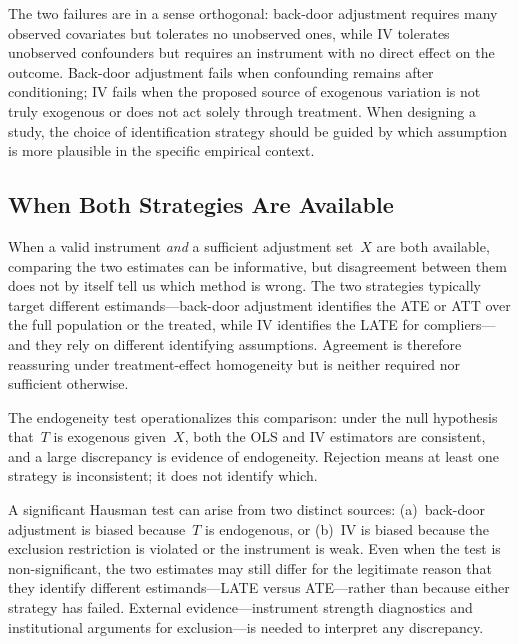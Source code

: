 \documentclass[master.tex]{subfiles}
\begin{document}
\medskip\noindent The two failures are in a sense orthogonal:
back-door adjustment requires many observed covariates but tolerates
no unobserved ones, while IV tolerates unobserved confounders but
requires an instrument with no direct effect on the outcome.
Back-door adjustment fails when confounding remains after
conditioning; IV fails when the proposed source of exogenous
variation is not truly exogenous or does not act solely through
treatment.  When designing a study, the choice of identification
strategy should be guided by which assumption is more plausible in
the specific empirical context.

\subsection{When Both Strategies Are Available}

When a valid instrument \emph{and} a sufficient adjustment set~$X$
are both available, comparing the two estimates can be informative,
but disagreement between them does not by itself tell us which
method is wrong.  The two strategies typically target different
estimands---back-door adjustment identifies the ATE or ATT over
the full population or the treated, while IV identifies the LATE
for compliers---and they rely on different identifying assumptions.
Agreement is therefore reassuring under treatment-effect homogeneity
but is neither required nor sufficient otherwise.

The \citet{hausman1978specification} endogeneity test operationalizes
this comparison: under the null hypothesis that~$T$ is exogenous
given~$X$, both the OLS and IV estimators are consistent, and a
large discrepancy is evidence of endogeneity.  Rejection means at
least one strategy is inconsistent; it does not identify which.

\begin{remark}
A significant Hausman test can arise from two distinct sources:
(a)~back-door adjustment is biased because~$T$ is endogenous, or
(b)~IV is biased because the exclusion restriction is violated or
the instrument is weak.  Even when the test is non-significant,
the two estimates may still differ for the legitimate reason that
they identify different estimands---LATE versus ATE---rather than
because either strategy has failed.  External evidence---instrument
strength diagnostics and institutional arguments for exclusion---is
needed to interpret any discrepancy.
\end{remark}
\end{document}
